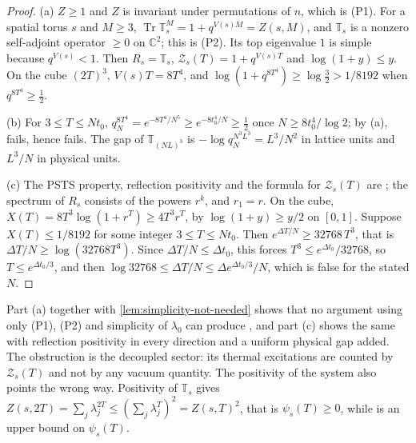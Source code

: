 \documentclass[11pt,a4paper]{amsart}
\theoremstyle{definition}
\theoremstyle{remark}
\numberwithin{equation}{section}
\DeclareMathOperator{\Tr}{Tr}        %
\newcommand{\C}{\mathbb{C}}          %
\newcommand{\PSTS}{\textup{PSTS}}          %
\newcommand{\TT}{\mathbb{T}}               %
\newcommand{\Zpart}[2]{Z(#1,#2)}           %
\newcommand{\Zc}{\mathcal{Z}}              %
\newcommand{\Zs}[2]{\Zc_{#1}(#2)}          %
\newcommand{\psiT}[2]{\psi_{#1}(#2)}       %
\newcommand{\Vol}[1]{V(#1)}                %
\newcommand{\cube}[1]{(2#1)^3}             %
\newcommand{\lzero}{\lambda_0}             %
\newcommand{\xconst}{\frac{1}{8192}}       %
\newcommand{\xconstinl}{1/8192}            %
\newcommand{\Mcirc}{\text{\upshape(M$^{\circ}$)}}   %
\newcommand{\Bcirc}{\text{\upshape(B$^{\circ}$)}}   %
\newcommand{\tzero}{t_0}                   %
\begin{document}
\begin{proof}
(a) $Z\ge1$ and $Z$ is invariant under permutations of $n$, which is (P1). For a spatial torus $s$ and $M\ge3$, $\Tr\TT_s^M=1+q^{\Vol{s}M}=Z(s,M)$, and $\TT_s$ is a nonzero self-adjoint operator $\ge0$ on $\C^2$; this is (P2). Its top eigenvalue $1$ is simple because $q^{\Vol{s}}<1$. Then $R_s=\TT_s$, $\Zs{s}{T}=1+q^{\Vol{s}T}$ and $\log(1+y)\le y$. On the cube $\cube{T}$, $\Vol{s}T=8T^4$, and $\log(1+q^{8T^4})\ge\log\frac32>\xconstinl$ when $q^{8T^4}\ge\frac12$.

(b) For $3\le T\le N\tzero$, $q_N^{8T^4}=e^{-8T^4/N^5}\ge e^{-8\tzero^4/N}\ge\frac12$ once $N\ge8\tzero^4/\log2$; by (a), \Bcirc{} fails, hence \Mcirc{} fails. The gap of $\TT_{(NL)^3}$ is $-\log q_N^{N^3L^3}=L^3/N^2$ in lattice units and $L^3/N$ in physical units.

(c) The \PSTS{} property, reflection positivity and the formula for $\Zs{s}{T}$ are \cite[Proposition~17]{bhattacharjee2026first}; the spectrum of $R_s$ consists of the powers $r^k$, and $r_1=r$. On the cube, $X(T)=8T^3\log(1+r^T)\ge4T^3r^T$, by $\log(1+y)\ge y/2$ on $[0,1]$. Suppose $X(T)\le\xconstinl$ for some integer $3\le T\le N\tzero$. Then $e^{\Delta T/N}\ge32768\,T^3$, that is $\Delta T/N\ge\log(32768T^3)$. Since $\Delta T/N\le\Delta\tzero$, this forces $T^3\le e^{\Delta\tzero}/32768$, so $T\le e^{\Delta\tzero/3}$, and then $\log32768\le\Delta T/N\le\Delta e^{\Delta\tzero/3}/N$, which is false for the stated $N$.
\end{proof}

Part (a) together with \cref{lem:simplicity-not-needed} shows that no argument using only (P1), (P2) and simplicity of $\lzero$ can produce \Bcirc{}, and part (c) shows the same with reflection positivity in every direction and a uniform physical gap added. The obstruction is the decoupled sector: its thermal excitations are counted by $\Zs{s}{T}$ and not by any vacuum quantity. The positivity of the system also points the wrong way. Positivity of $\TT_s$ gives $\Zpart{s}{2T}=\sum_j\lambda_j^{2T}\le(\sum_j\lambda_j^T)^2=\Zpart{s}{T}^2$, that is $\psiT{s}{T}\ge0$, while \Mcirc{} is an upper bound on $\psiT{s}{T}$.
\end{document}
